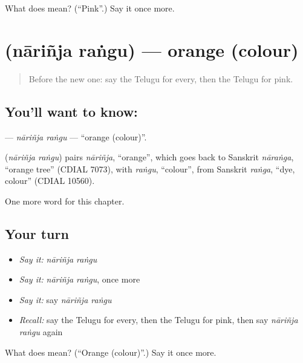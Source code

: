 \begin{tcolorbox}[breakable,colback=teal!4,colframe=teal!35!black,title={Before you move on}]
What does   mean? (\textquotedblleft{}Pink\textquotedblright{}.) Say it once more.
\end{tcolorbox}
\section[\texorpdfstring{\te{నారింజ} \te{రంగు} (nāriñja raṅgu)}{నారింజ రంగు (nāriñja raṅgu)}]{  (nāriñja raṅgu) — orange (colour)}

\label{lesson:TE-C180-narinja-rangu}



\begin{quote}
Before the new one: say the Telugu for every, then the Telugu for pink.
\end{quote}

\subsection*{You'll want to know:  }
\textbf{ } — \emph{nāriñja raṅgu} — \textquotedblleft{}orange (colour)\textquotedblright{}.

\begin{cousinweb}
\textbf{ } (\emph{nāriñja raṅgu}) pairs \emph{nāriñja}, \textquotedblleft{}orange\textquotedblright{}, which goes back to Sanskrit \emph{nāraṅga}, \textquotedblleft{}orange tree\textquotedblright{} (CDIAL 7073), with \emph{raṅgu}, \textquotedblleft{}colour\textquotedblright{}, from Sanskrit \emph{raṅga}, \textquotedblleft{}dye, colour\textquotedblright{} (CDIAL 10560).
\end{cousinweb}

\begin{grammarlens}[title={What you've built}]
One more word for this chapter.
\end{grammarlens}

\subsection*{Your turn}
\begin{itemize}
\raggedright
  \item \emph{Say it:} \emph{nāriñja raṅgu}
  \item \emph{Say it:} \emph{nāriñja raṅgu}, once more
  \item \emph{Say it:} say \emph{nāriñja raṅgu}
  \item \emph{Recall:} say the Telugu for every, then the Telugu for pink, then say \emph{nāriñja raṅgu} again
\end{itemize}

\begin{tcolorbox}[breakable,colback=teal!4,colframe=teal!35!black,title={Before you move on}]
What does   mean? (\textquotedblleft{}Orange (colour)\textquotedblright{}.) Say it once more.
\end{tcolorbox}
